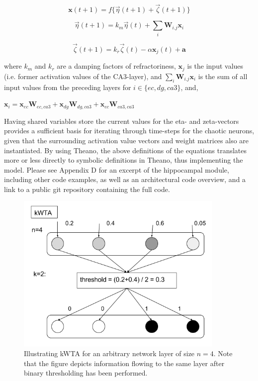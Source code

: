 \begin{equation}\label{eq:eta_zeta_sum}
    \textbf{x}(t+1) = f\{ \vec{\eta}(t+1) + \vec{\zeta}(t+1) \}
\end{equation}

\begin{equation}
    \vec{\eta}(t+1) = k_m \vec{\eta}(t) + \sum_{i} \textbf{W}_{i.j} \textbf{x}_i
\end{equation}

\begin{equation}
    \vec{\zeta}(t+1) = k_r \vec{\zeta}(t) - \alpha \textbf{x}_j(t) + \textbf{a}
\end{equation}

where $k_m$ and $k_r$ are a damping factors of refractoriness, $\textbf{x}_j$ is the input values (i.e. former activation values of the CA3-layer), and $\sum_{i} \textbf{W}_{i.j} \textbf{x}_i$ is the sum of all input values from the preceding layers for $i\in\{ec, dg, ca3\}$, and,

\begin{center}
\begin{math}
    \textbf{x}_i = \textbf{x}_{ec} \textbf{W}_{ec, ca3} + \textbf{x}_{dg} \textbf{W}_{dg, ca3} + \textbf{x}_{ec} \textbf{W}_{ca3, ca3}
\end{math}
\end{center}

Having shared variables store the current values for the eta- and zeta-vectors provides a sufficient basis for iterating through time-steps for the chaotic neurons, given that the surrounding activation value vectors and weight matrices also are instantiated. By using Theano, the above definitions of the equations translates more or less directly to symbolic definitions in Theano, thus implementing the model. Please see Appendix D for an excerpt of the hippocampal module, including other code examples, as well as an architectural code overview, and a link to a public git repository containing the full code.

\begin{figure}
    \centering
    \includegraphics[width=10cm]{fig/kWTA}
    \caption{Illustrating kWTA for an arbitrary network layer of size $n=4$. Note that the figure depicts information flowing to  the same layer after binary thresholding has been performed.}
    \label{fig:kWTA_illustration}
\end{figure}

